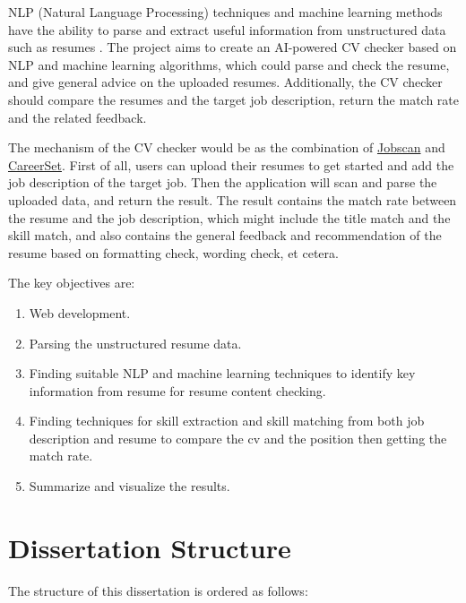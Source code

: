 NLP (Natural Language Processing) techniques and machine learning methods have the ability to parse and extract useful information from unstructured data such as resumes \cite{sinha2021resume}. The project aims to create an AI-powered CV checker based on NLP and machine learning algorithms, which could parse and check the resume, and give general advice on the uploaded resumes. Additionally, the CV checker should compare the resumes and the target job description, return the match rate and the related feedback.
 
The mechanism of the CV checker would be as the combination of \href{https://www.jobscan.co/}{Jobscan} and \href{https://careerset.com/}{CareerSet}. First of all, users can upload their resumes to get started and add the job description of the target job. Then the application will scan and parse the uploaded data, and return the result. The result contains the match rate between the resume and the job description, which might include the title match and the skill match, and also contains the general feedback and recommendation of the resume based on formatting check, wording check, et cetera.
 
The key objectives are:

\begin{enumerate}
    \item Web development.
    \item Parsing the unstructured resume data.
    \item Finding suitable NLP and machine learning techniques to identify key information from resume for resume content checking.
    \item Finding techniques for skill extraction and skill matching from both job description and resume to compare the cv and the position then getting the match rate.
    \item Summarize and visualize the results.
    
\end{enumerate}


\section{Dissertation Structure}

The structure of this dissertation is ordered as follows: 

